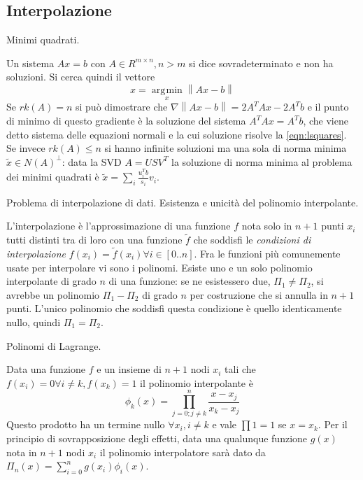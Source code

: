 \documentclass[answers, a4paper]{exam}
\newcommand{\norm}[1]{\left\lVert#1\right\rVert}
\DeclareMathOperator*{\argmin}{\arg\!\min}
\begin{document}
\begin{questions}
	\section{Interpolazione}
	\question Minimi quadrati.
	\begin{solution}Un sistema $Ax = b$ con $A \in R^{m\times n}, n > m$ si dice sovradeterminato e non ha soluzioni.
		Si cerca quindi il vettore \begin{equation}
		\label{eqn:lsquares}
		x = \argmin\limits_x \norm{Ax - b}
	\end{equation}
	Se $rk(A) = n$ si può dimostrare che $\nabla \norm{Ax - b} = 2A^T A x - 2A^Tb$ e il punto di minimo di questo gradiente è la soluzione del sistema $A^T A x = A^T b$, che viene detto sistema delle equazioni normali e la cui soluzione risolve la \cref{eqn:lsquares}.
	Se invece $rk(A) \leq n$ si hanno infinite soluzioni ma una sola di norma minima $\tilde{x} \in N(A)^\perp$: data la SVD $A = U S V^T$ la soluzione di norma minima al problema dei minimi quadrati è $\tilde{x} = \sum_i \frac{u_i^T b}{s_i}  v_i$.
	\end{solution}
	\question Problema di interpolazione di dati. Esistenza e unicità del polinomio interpolante.
	\begin{solution}
		L'interpolazione è l'approssimazione di una funzione $f$ nota solo in $n + 1$ punti $x_i$ tutti distinti tra di loro con una funzione $\tilde{f}$ che soddisfi le \textit{condizioni di interpolazione} $f(x_i) = \tilde{f}(x_i) \forall i \in [0..n]$. 
		Fra le funzioni più comunemente usate per interpolare vi sono i polinomi.
		Esiste uno e un solo polinomio interpolante di grado $n$ di una funzione: se ne esistessero due, $\Pi_1 \neq \Pi_2$, si avrebbe un polinomio $\Pi_1 - \Pi_2$ di grado $n$ per costruzione che si annulla in $n + 1$ punti. 
		L'unico polinomio che soddisfi questa condizione è quello identicamente nullo, quindi $\Pi_1 = \Pi_2$.
	\end{solution}
	\question Polinomi di Lagrange.
	\begin{solution}
		Data una funzione $f$ e un insieme di $n + 1$ nodi $x_i$ tali che $f(x_i) = 0 \forall i \neq k, f(x_k) = 1$ il polinomio interpolante è 
		\begin{equation}\phi_k (x) = \prod\limits_{j = 0; j \neq k}^n \frac{x - x_j}{x_k - x_j}\end{equation}
		Questo prodotto ha un termine nullo $\forall x_i, i \neq k$ e vale $\prod 1 = 1$ se $x = x_k$.
		Per il principio di sovrapposizione degli effetti, data una qualunque funzione $g(x)$ nota in $n + 1$ nodi $x_i$ il polinomio interpolatore sarà dato da $\Pi_n (x) = \sum\limits_{i = 0}^n g(x_i) \phi_i (x)$.

\end{solution}
\end{questions}
\end{document}
